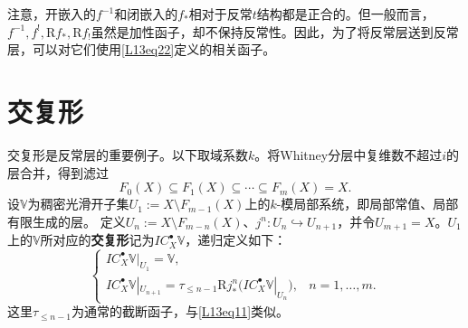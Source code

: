 注意，开嵌入的$f^{-1}$和闭嵌入的$f_*$相对于反常$t$结构都是正合的。但一般而言，$f^{-1},f^!,\mathrm Rf_*,\mathrm Rf_!$虽然是加性函子，却不保持反常性。因此，为了将反常层送到反常层，可以对它们使用\eqref{L13eq22}定义的相关函子。
\section{交复形}\label{L13S3}
交复形是反常层的重要例子。以下取域系数$k$。将Whitney分层中复维数不超过$i$的层合并，得到滤过
\[F_0(X)\subseteq F_1(X)\subseteq\cdots\subseteq F_m(X)=X.\]
设$\mathbb V$为稠密光滑开子集$U_1:=X\setminus F_{m-1}(X)$上的$k$-模局部系统，即局部常值、局部有限生成的层。
定义$U_n:=X\setminus F_{m-n}(X)$、$j^n:U_n\hookrightarrow U_{n+1}$，并令$U_{m+1}=X$。$U_1$上的$\mathbb V$所对应的\textbf{交复形}记为$IC_X^\bullet\mathbb V$，递归定义如下：
\[\begin{cases}
IC_X^\bullet\mathbb V|_{U_1}=\mathbb V,\\
IC_X^\bullet\mathbb V|_{U_{n+1}}=\tau_{\le n-1}\mathrm Rj^n_*\bigl(IC_X^\bullet\mathbb V|_{U_n}\bigr),&n=1,\ldots,m.
\end{cases}\]
这里$\tau_{\le n-1}$为通常的截断函子，与\eqref{L13eq11}类似。

